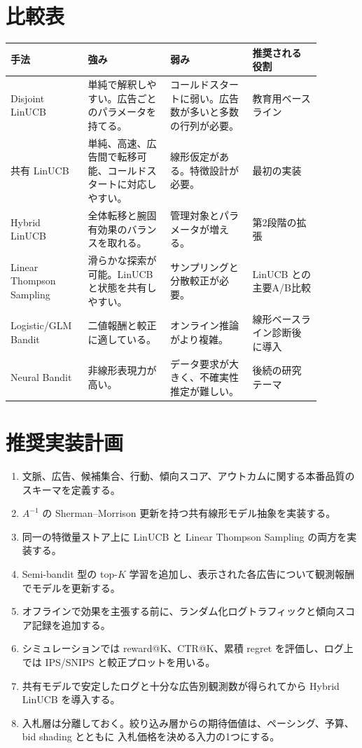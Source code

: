 \documentclass[uplatex,dvipdfmx,11pt,a4paper]{bxjsarticle}
\begin{document}
\section{比較表}
\begin{longtable}{p{0.20\linewidth}p{0.24\linewidth}p{0.24\linewidth}p{0.20\linewidth}}
\toprule
手法 & 強み & 弱み & 推奨される役割 \\
\midrule
Disjoint LinUCB & 単純で解釈しやすい。広告ごとのパラメータを持てる。 & コールドスタートに弱い。広告数が多いと多数の行列が必要。 & 教育用ベースライン \\
共有 LinUCB & 単純、高速、広告間で転移可能、コールドスタートに対応しやすい。 & 線形仮定がある。特徴設計が必要。 & 最初の実装 \\
Hybrid LinUCB & 全体転移と腕固有効果のバランスを取れる。 & 管理対象とパラメータが増える。 & 第2段階の拡張 \\
Linear Thompson Sampling & 滑らかな探索が可能。LinUCB と状態を共有しやすい。 & サンプリングと分散較正が必要。 & LinUCB との主要A/B比較 \\
Logistic/GLM Bandit & 二値報酬と較正に適している。 & オンライン推論がより複雑。 & 線形ベースライン診断後に導入 \\
Neural Bandit & 非線形表現力が高い。 & データ要求が大きく、不確実性推定が難しい。 & 後続の研究テーマ \\
\bottomrule
\end{longtable}

\section{推奨実装計画}
\begin{enumerate}[leftmargin=2em]
  \item 文脈、広告、候補集合、行動、傾向スコア、アウトカムに関する本番品質のスキーマを定義する。
  \item $A^{-1}$ の Sherman--Morrison 更新を持つ共有線形モデル抽象を実装する。
  \item 同一の特徴量ストア上に LinUCB と Linear Thompson Sampling の両方を実装する。
  \item Semi-bandit 型の top-$K$ 学習を追加し、表示された各広告について観測報酬でモデルを更新する。
  \item オフラインで効果を主張する前に、ランダム化ログトラフィックと傾向スコア記録を追加する。
  \item シミュレーションでは reward@K、CTR@K、累積 regret を評価し、ログ上では IPS/SNIPS と較正プロットを用いる。
  \item 共有モデルで安定したログと十分な広告別観測数が得られてから Hybrid LinUCB を導入する。
  \item 入札層は分離しておく。絞り込み層からの期待価値は、ペーシング、予算、bid shading とともに
  入札価格を決める入力の1つにする。
\end{enumerate}
\end{document}
